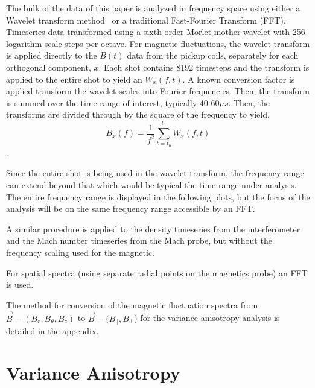 \documentclass[aip,prl,amsmath,amssymb,reprint,superscriptaddress]{revtex4-1} %
\begin{document}
The bulk of the data of this paper is analyzed in frequency space using either a Wavelet transform method~\cite{torrence98} or a traditional Fast-Fourier Transform (FFT). Timeseries data transformed using a sixth-order Morlet mother wavelet with 256 logarithm scale steps per octave. For magnetic fluctuations, the wavelet transform is applied directly to the $\dot{B}(t)$ data from the pickup coils, separately for each orthogonal component, $x$. Each shot contains 8192 timesteps and the transform is applied to the entire shot to yield an $W_{x}(f,t)$. A known conversion factor is applied transform the wavelet scales into Fourier frequencies. Then, the transform is summed over the time range of interest, typically 40-60$\mu s$. Then, the transforms are divided through by the square of the frequency to yield,
\begin{equation}
B_{x}(f) = \frac{1}{f^{2}}\sum_{t=t_{0}}^{t_{1}} W_{x}(f,t)
\label{eq:wavelet_transform}
\end{equation}.

Since the entire shot is being used in the wavelet transform, the frequency range can extend beyond that which would be typical the time range under analysis. The entire frequency range is displayed in the following plots, but the focus of the analysis will be on the same frequency range accessible by an FFT.

A similar procedure is applied to the density timeseries from the interferometer and the Mach number timeseries from the Mach probe, but without the frequency scaling used for the magnetic.

For spatial spectra (using separate radial points on the magnetics probe) an FFT is used.

The method for conversion of the magnetic fluctuation spectra from $\vec{B} = (B_{r},B_{\theta},B_{z})$ to $\vec{B} = (B_{\parallel},B_{\perp}$) for the variance anisotropy analysis is detailed in the appendix.

\section{Variance Anisotropy}\label{sec:variance}
\end{document}
